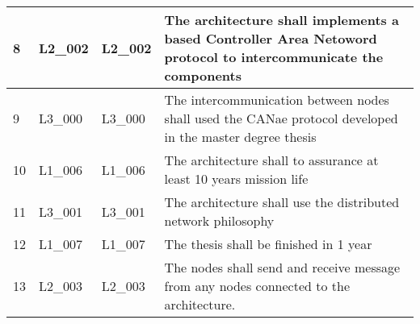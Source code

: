 \begin{sidewaystable}[]
\begin{tabular}{|l|l|l|l|}
8                               & L2\_002                          & L2\_002                            & The architecture shall implements a based Controller Area Netoword protocol to intercommunicate the components \\ \hline
9                               & L3\_000                          & L3\_000                            & The intercommunication between nodes shall used the CANae protocol developed in the master degree thesis       \\ \hline
10                              & L1\_006                          & L1\_006                            & The architecture shall to assurance at least 10 years mission life                                             \\ \hline
11                              & L3\_001                          & L3\_001                            & The architecture shall use the distributed network philosophy                                                  \\ \hline
12                              & L1\_007                          & L1\_007                            & The thesis shall be finished in 1 year                                                                         \\ \hline
13 & L2\_003 & L2\_003 & The nodes shall send and receive message from any nodes connected to the architecture. \\ \hline
\end{tabular}
\end{sidewaystable}

